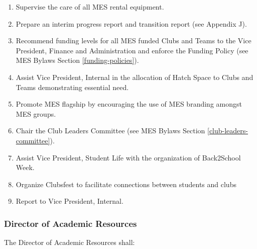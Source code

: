 \begin{enumerate}
 \item
  Supervise the care of all MES rental equipment.
 \item
  Prepare an interim progress report and transition report (see Appendix J). %
 \item
  Recommend funding levels for all MES funded Clubs and Teams to the Vice President, Finance and Administration and enforce the Funding Policy (see MES Bylaws Section \ref{funding-policies}).
 \item
  Assist Vice President, Internal in the allocation of Hatch Space to Clubs and Teams demonstrating essential need.
 \item
  Promote MES flagship by encouraging the use of MES branding amongst MES groups.
 \item
  Chair the Club Leaders Committee (see MES Bylaws Section \ref{club-leaders-committee}).
 \item
  Assist Vice President, Student Life with the organization of Back2School Week.
 \item
  Organize Clubsfest to facilitate connections between students and clubs
 \item
  Report to Vice President, Internal.

\end{enumerate}

\subsubsection{Director of Academic Resources}
\label{director-of-academic-resources}
The Director of Academic Resources shall:

